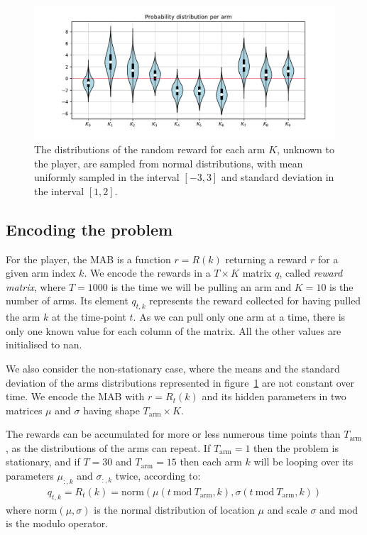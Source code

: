 \documentclass[]{scrartcl}
\theoremstyle{definition}
\begin{document}
\begin{figure}[h]
    \hspace{-1.5cm}
    \includegraphics[width=18cm]{figures/initial_distributions.pdf}
    \caption{The distributions of the random reward for each arm $K$, unknown to the player, are sampled from normal distributions, with mean uniformly sampled in the interval $[-3, 3]$ and standard deviation in the interval $[1, 2]$.}
    \label{fig:volin_plot}
\end{figure}

\subsection*{Encoding the problem}
For the player, the MAB is a function $r = R(k)$ returning a reward $r$ for a given arm index $k$. We encode the rewards in a $T\times K$ matrix $q$, called \emph{reward matrix}, where $T=1000$ is the time we will be pulling an arm and $K=10$ is the number of arms. Its element $q_{t, k}$ represents the reward collected for having pulled the arm $k$ at the time-point $t$. As we can pull only one arm at a time, there is only one known value for each column of the matrix. All the other values are initialised to nan.

We also consider the non-stationary case, where the means and the standard deviation of the arms distributions represented in figure~\ref{fig:volin_plot} are not constant over time. We encode  the MAB with $r = R_{t}(k)$ and its hidden parameters in two matrices $\mu$ and $\sigma$ having shape $T_{\text{arm}} \times K$. 

The rewards can be accumulated for more or less numerous time points than $T_{\text{arm}}$, as the distributions of the arms can repeat. If $T_{\text{arm}}=1$ then the problem is stationary, and if $T=30$ and $T_{\text{arm}}=15$ then each arm $k$ will be looping over its parameters $\mu_{:, k}$ and $\sigma_{:, k}$ twice, according to:
\begin{align*}
q_{t, k} 
=
R_{t}(k)
=
\text{norm}\left(\mu({t~\text{mod}~T_{\text{arm}}, k}), \sigma({t~\text{mod}~T_{\text{arm}}, k})\right)
\end{align*}
where $\text{norm}(\mu, \sigma)$ is the normal distribution of location $\mu$ and scale $\sigma$ and mod is the modulo operator.
\end{document}
